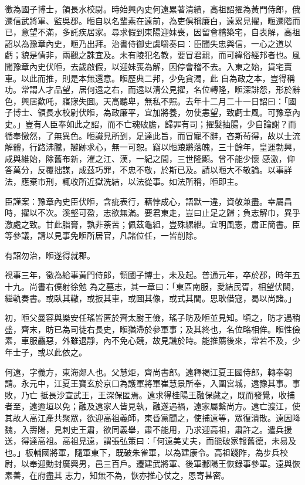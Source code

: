 \begin{pinyinscope}
 徵為國子博士，領長水校尉。時始興內史何遠累著清績，高祖詔擢為黃門侍郎，俄遷信武將軍、監吳郡。暅自以名輩素在遠前，為吏俱稱廉白，遠累見擢，暅遷階而已，意望不滿，多託疾居家。尋求假到東陽迎妹喪，因留會稽築宅，自表解，高祖詔以為豫章內史，暅乃出拜。治書侍御史虞嚼奏曰：臣聞失忠與信，一心之道以虧；貌是情非，兩觀之誅宜及。未有陵犯名教，要冒君親，而可緯俗經邦者也。風聞豫章內史伏暅，去歲啟假，以迎妹喪為解，因停會稽不去。入東之始，貨宅賣車。以此而推，則是本無還意。暅歷典二邦，少免貪濁，此
 自為政之本，豈得稱功。常謂人才品望，居何遠之右，而遠以清公見擢，名位轉隆，暅深誹怨，形於辭色，興居歎吒，寤寐失圖。天高聽卑，無私不照。去年十二月二十一日詔曰：「國子博士、領長水校尉伏暅，為政廉平，宜加將養，勿使恚望，致虧士風。可豫章內史。」豈有人臣奉如此之詔，而不亡魂破膽，歸罪有司；擢髮抽腸，少自論謝？而循奉慠然，了無異色。暅識見所到，足達此旨，而冒寵不辭，吝斯茍得，故以士流解體，行路沸騰，辯跡求心，無一可恕。竊以暅踉蹡落魄，三十餘年，皇運勃興，咸與維始，除舊布新，濯之江、漢，一紀之間，三世隆顯。曾不能少懷
 感激，仰答萬分，反覆拙謀，成茲巧罪，不忠不敬，於斯已及。請以暅大不敬論。以事詳法，應棄市刑，輒收所近獄洗結，以法從事。如法所稱，暅即主。



 臣謹案：豫章內史臣伏暅，含疵表行，藉悖成心，語默一違，資敬兼盡。幸屬昌時，擢以不次。溪壑可盈，志欲無滿。要君東走，豈曰止足之歸；負志解巾，異乎激處之致。甘此脂膏，孰非荼苦；佩茲龜組，豈殊縲紲。宜明風憲，肅正簡書。臣等參議，請以見事免暅所居官，凡諸位任，一皆削除。



 有詔勿治，暅遂得就郡。



 視事三年，徵為給事黃門侍郎，領國子博士，未及起。普通元年，卒於郡，時年五十九。尚書右僕射徐勉
 為之墓志，其一章曰：「東區南服，愛結民胥，相望伏闕，繼軌奏書。或臥其轍，或扳其車，或圖其像，或式其閭。思耿借寇，曷以尚諸。」



 初，暅父曼容與樂安任瑤皆匿於齊太尉王儉，瑤子昉及暅並見知。頃之，昉才遇稍盛，齊末，昉已為司徒右長史，暅猶滯於參軍事；及其終也，名位略相侔。暅性儉素，車服麤惡，外雖退靜，內不免心競，故見譏於時。能推薦後來，常若不及，少年士子，或以此依之。



 何遠，字義方，東海郯人也。父慧炬，齊尚書郎。遠釋褐江夏王國侍郎，轉奉朝請。永元中，江夏王寶玄於京口為護軍將軍崔慧景所奉，入圍宮城，遠豫其事。事敗，乃亡
 抵長沙宣武王，王深保匿焉。遠求得桂陽王融保藏之，既而發覺，收捕者至，遠逾垣以免；融及遠家人皆見執，融遂遇禍，遠家屬繫尚方。遠亡渡江，使其故人高江產共聚眾，欲迎高祖義師，東昏黨聞之，使捕遠等，眾復潰散。遠因降魏，入壽陽，見刺史王肅，欲同義舉，肅不能用，乃求迎高祖，肅許之。遣兵援送，得達高祖。高祖見遠，謂張弘策曰：「何遠美丈夫，而能破家報舊德，未易及也。」板輔國將軍，隨軍東下，既破朱雀軍，以為建康令。高祖踐阼，為步兵校尉，以奉迎勳封廣興男，邑三百戶。遷建武將軍、後軍鄱陽王恢錄事參軍。遠與恢素善，在府盡其
 志力，知無不為，恢亦推心仗之，恩寄甚密。




\end{pinyinscope}
